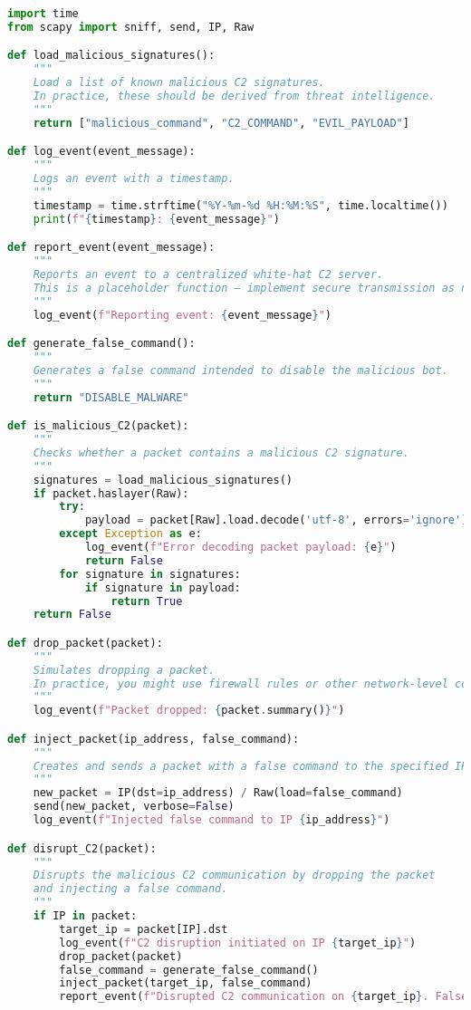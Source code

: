 \documentclass{article}
\begin{document}
\begin{lstlisting}[language=Python, caption={Python Code for C2 Disruption Mechanism}]
import time
from scapy import sniff, send, IP, Raw

def load_malicious_signatures():
    """
    Load a list of known malicious C2 signatures.
    In practice, these should be derived from threat intelligence.
    """
    return ["malicious_command", "C2_COMMAND", "EVIL_PAYLOAD"]

def log_event(event_message):
    """
    Logs an event with a timestamp.
    """
    timestamp = time.strftime("%Y-%m-%d %H:%M:%S", time.localtime())
    print(f"{timestamp}: {event_message}")

def report_event(event_message):
    """
    Reports an event to a centralized white-hat C2 server.
    This is a placeholder function – implement secure transmission as needed.
    """
    log_event(f"Reporting event: {event_message}")

def generate_false_command():
    """
    Generates a false command intended to disable the malicious bot.
    """
    return "DISABLE_MALWARE"

def is_malicious_C2(packet):
    """
    Checks whether a packet contains a malicious C2 signature.
    """
    signatures = load_malicious_signatures()
    if packet.haslayer(Raw):
        try:
            payload = packet[Raw].load.decode('utf-8', errors='ignore')
        except Exception as e:
            log_event(f"Error decoding packet payload: {e}")
            return False
        for signature in signatures:
            if signature in payload:
                return True
    return False

def drop_packet(packet):
    """
    Simulates dropping a packet.
    In practice, you might use firewall rules or other network-level controls.
    """
    log_event(f"Packet dropped: {packet.summary()}")

def inject_packet(ip_address, false_command):
    """
    Creates and sends a packet with a false command to the specified IP address.
    """
    new_packet = IP(dst=ip_address) / Raw(load=false_command)
    send(new_packet, verbose=False)
    log_event(f"Injected false command to IP {ip_address}")

def disrupt_C2(packet):
    """
    Disrupts the malicious C2 communication by dropping the packet
    and injecting a false command.
    """
    if IP in packet:
        target_ip = packet[IP].dst
        log_event(f"C2 disruption initiated on IP {target_ip}")
        drop_packet(packet)
        false_command = generate_false_command()
        inject_packet(target_ip, false_command)
        report_event(f"Disrupted C2 communication on {target_ip}. False command injected.")


\end{lstlisting}
\end{document}
